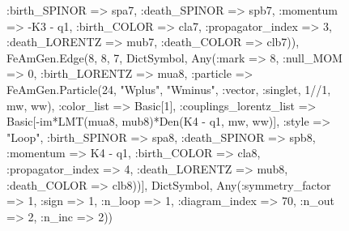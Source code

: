 \documentclass{revtex4}
\begin{document}
\begin{figure}[!htb]
\begin{center}
{:birth_SPINOR => spa7, :death_SPINOR => spb7, :momentum => -K3 - q1, :birth_COLOR => cla7, :propagator_index => 3, :death_LORENTZ => mub7, :death_COLOR => clb7)), FeAmGen.Edge(8, 8, 7, Dict{Symbol, Any}(:mark => 8, :null_MOM => 0, :birth_LORENTZ => mua8, :particle => FeAmGen.Particle(24, "Wplus", "Wminus", :vector, :singlet, 1//1, mw, ww), :color_list => Basic[1], :couplings_lorentz_list => Basic[-im*LMT(mua8, mub8)*Den(K4 - q1, mw, ww)], :style => "Loop", :birth_SPINOR => spa8, :death_SPINOR => spb8, :momentum => K4 - q1, :birth_COLOR => cla8, :propagator_index => 4, :death_LORENTZ => mub8, :death_COLOR => clb8))], Dict{Symbol, Any}(:symmetry_factor => 1, :sign => 1, :n_loop => 1, :diagram_index => 70, :n_out => 2, :n_inc => 2)) 
}
\end{center}
\end{figure}
\end{document}
